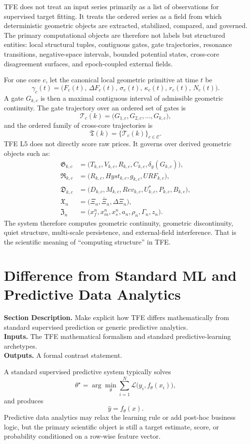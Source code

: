 \documentclass[11pt]{report}
\newcommand{\meta}[3]{\textbf{Section Description.} #1\\
\textbf{Inputs.} #2\\
\textbf{Outputs.} #3\par}
\begin{document}
TFE does not treat an input series primarily as a list of observations for supervised target fitting. It treats the ordered series as a field from which deterministic geometric objects are extracted, stabilized, compared, and governed. The primary computational objects are therefore not labels but structured entities: local structural tuples, contiguous gates, gate trajectories, resonance transitions, negative-space intervals, bounded potential states, cross-core disagreement surfaces, and epoch-coupled external fields.

For one core $c$, let the canonical local geometric primitive at time $t$ be
\[
\gamma_c(t)=\big(F_c(t),\,\Delta F_c(t),\,\sigma_c(t),\,\kappa_c(t),\,r_c(t),\,N_c(t)\big).
\]
A gate $G_{k,c}$ is then a maximal contiguous interval of admissible geometric continuity. The gate trajectory over an ordered set of gates is
\[
\mathcal{T}_{c}(k)=\big(G_{1,c},G_{2,c},\dots,G_{k,c}\big),
\]
and the ordered family of cross-core trajectories is
\[
\mathfrak{T}(k)=\{\mathcal{T}_{c}(k)\}_{c\in\mathcal{C}}.
\]
TFE L5 does not directly score raw prices. It governs over derived geometric objects such as:
\begin{align*}
\mathfrak{G}_{k,c} &= \big(T_{k,c},V_{k,c},R_{k,c},C_{k,c},\delta_g(G_{k,c})\big),\\
\mathfrak{R}_{k,c} &= \big(R_{k,c},Hyst_{k,c},g_{k,c},URF_{k,c}\big),\\
\mathfrak{D}_{k,c} &= \big(D_{k,c},M_{k,c},Rev_{k,c},U^{\ast}_{k,c},P_{k,c},B_{k,c}\big),\\
\mathfrak{X}_{n} &= \big(\Xi_n,\bar\Xi_n,\Delta\Xi_n\big),\\
\mathfrak{Z}_{n} &= \big(x_f^n,x_m^n,x_s^n,a_n,\rho_n,\Gamma_n,z_n\big).
\end{align*}
The system therefore computes geometric continuity, geometric discontinuity, quiet structure, multi-scale persistence, and external-field interference. That is the scientific meaning of ``computing structure'' in TFE.

\section{Difference from Standard ML and Predictive Data Analytics}
\meta{Make explicit how TFE differs mathematically from standard supervised prediction or generic predictive analytics.}{The TFE mathematical formalism and standard predictive-learning archetypes.}{A formal contrast statement.}

A standard supervised predictive system typically solves
\[
\theta^{\star}=\arg\min_{\theta}\sum_{i=1}^{N}\mathcal{L}\big(y_i, f_{\theta}(x_i)\big),
\]
and produces
\[
\hat y = f_{\theta}(x).
\]
Predictive data analytics may relax the learning rule or add post-hoc business logic, but the primary scientific object is still a target estimate, score, or probability conditioned on a row-wise feature vector.
\end{document}

